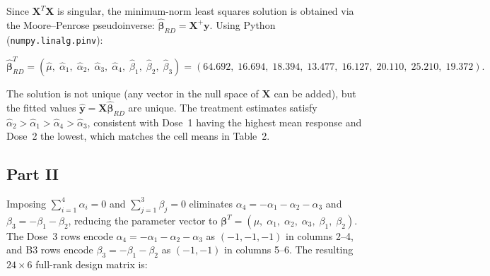 \documentclass[letterpaper]{article}
\begin{document}
				Since $\mathbf{X}^T\mathbf{X}$ is singular, the minimum-norm least
				squares solution is obtained via the Moore--Penrose pseudoinverse:
				$\hat{\boldsymbol{\beta}}_{RD} = \mathbf{X}^+\mathbf{y}$.
				Using Python (\texttt{numpy.linalg.pinv}):
				
				\[
				\hat{\boldsymbol{\beta}}_{RD}^T
				= (\hat\mu,\;\hat\alpha_1,\;\hat\alpha_2,\;\hat\alpha_3,\;\hat\alpha_4,\;
				\hat\beta_1,\;\hat\beta_2,\;\hat\beta_3)
				= (64.692,\;16.694,\;18.394,\;13.477,\;16.127,\;
				20.110,\;25.210,\;19.372).
				\]
				
				The solution is not unique (any vector in the null space of $\mathbf{X}$
				can be added), but the fitted values $\hat{\mathbf{y}} = \mathbf{X}\hat{\boldsymbol{\beta}}_{RD}$
				are unique. The treatment estimates satisfy
				$\hat\alpha_2 > \hat\alpha_1 > \hat\alpha_4 > \hat\alpha_3$,
				consistent with Dose~1 having the highest mean response and Dose~2 the
				lowest, which matches the cell means in Table~2.
				
			\clearpage
			\subsection{Part II}
				
				Imposing $\sum_{i=1}^4\alpha_i=0$ and $\sum_{j=1}^3\beta_j=0$
				eliminates $\alpha_4 = -\alpha_1-\alpha_2-\alpha_3$ and
				$\beta_3 = -\beta_1-\beta_2$, reducing the parameter vector to
				$\boldsymbol{\beta}^T = (\mu,\;\alpha_1,\;\alpha_2,\;\alpha_3,\;\beta_1,\;\beta_2)$.
				The Dose~3 rows encode
				$\alpha_4 = -\alpha_1-\alpha_2-\alpha_3$ as $(-1,-1,-1)$ in columns
				2--4, and B3 rows encode $\beta_3=-\beta_1-\beta_2$ as $(-1,-1)$ in
				columns 5--6. The resulting $24\times6$ full-rank design matrix is:
				
\end{document}
